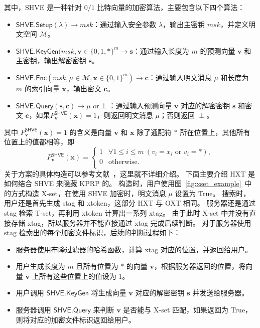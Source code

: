 其中，SHVE 是一种针对 $0/1$ 比特向量的加密算法，主要包含以下四个算法：
\begin{itemize}
  \item $\mathsf{SHVE}.\mathsf{Setup}(\lambda) \to msk$：通过输入安全参数 $\lambda$，输出主密钥 $msk$，并定义明文空间 $\mathcal{M}$。
  \item $\mathsf{SHVE}.\mathsf{KeyGen}(msk, \mathbf{v} \in \{0,1,*\}^m \to \mathbf{s} $：通过输入长度为 $m$ 的预测向量 $\mathbf{v}$ 和主密钥，输出解密密钥 $\mathbf{s}$。
  \item $\mathsf{SHVE}.\mathsf{Enc}(msk, \mu\in \mathcal{M}, \mathbf{x} \in \{0,1\}^m ) \to \mathbf{c}$：通过输入明文消息 $\mu$ 和长度为 $m$ 的索引向量 $\mathbf{x}$，输出密文 $\mathbf{c}$。
  \item $\mathsf{SHVE}.\mathsf{Query}(\mathbf{s}, \mathbf{c}) \to \mu \mbox{ or} \perp$：通过输入预测向量 $\mathbf{v}$ 对应的解密密钥 $\mathbf{s}$ 和密文 $\mathbf{c}$，如果$P_{\mathbf{v}}^{\mathsf{SHVE}}(\mathbf{x}) = 1$，则返回明文消息 $\mu$；否则返回 $\perp$。
\end{itemize}
其中 $P_{\mathbf{v}}^{\mathsf{SHVE}}(\mathbf{x})=1$ 的含义是向量 $\mathbf{v}$ 和 $\mathbf{x}$ 除了通配符 $*$ 所在位置上，其他所有位置上的值都相等，即
\begin{equation}
  P_{\mathbf{v}}^{\mathsf{SHVE}}(\mathbf{x}) = \left\{
  \begin{array}{ll}
  1 & \forall 1\leq i \leq m \  (v_i = x_i \mbox{ or } v_i=*), \\
  0 & \mbox{otherwise}. \\
  \end{array}
  \right.
\end{equation}
关于方案的具体构造可以参考文献~\cite{lai2018result}，这里就不详细介绍。
下面主要介绍 HXT 是如何结合 SHVE 来隐藏 KPRP 的。
构造时，用户使用图~\ref{fig:xset_example}~中的方式构造 X-set，在使用 SHVE 加密时，明文消息 $\mu$ 设置为 True。
搜索时，用户还是首先生成 stag 和 xtoken，这部分 HXT 与 OXT 相同。
服务器还是通过 stag 检索 T-set，再利用 xtoken 计算出一系列 xtag。
由于此时 X-set 中并没有直接存储 xtag，所以服务器并不能直接通过 xtag 完成后续判断。
对于服务器使用 stag 检索出的每个加密文件标识，后续的判断过程如下：
\begin{itemize}
  \item 服务器使用布隆过滤器的哈希函数，计算 xtag 对应的位置，并返回给用户。
  \item 用户生成长度为 $m$ 且所有位置为 $*$ 的向量 $\mathbf{v}$，根据服务器返回的位置，将向量 $\mathbf{v}$ 上所有这些位置上的值设为 $1$。
  \item 用户调用 $\mathsf{SHVE}.\mathsf{KeyGen}$ 将生成向量 $\mathbf{v}$ 对应的解密密钥 $\mathbf{s}$ 并发送给服务器。
  \item 服务器调用 $\mathsf{SHVE}.\mathsf{Query}$ 来判断 $\mathbf{v}$ 是否能与 X-set 匹配，如果返回为 True，则将对应的加密文件标识返回给用户。
\end{itemize}
